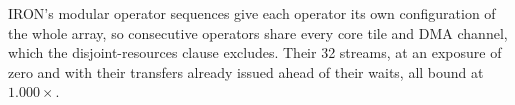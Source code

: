 IRON's modular operator sequences give each operator its own configuration of the whole array, so consecutive operators share every core tile and DMA channel, which the disjoint-resources clause excludes.
Their 32 streams, at an exposure of zero and with their transfers already issued ahead of their waits, all bound at $1.000\times$.

